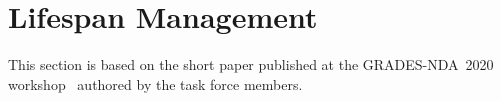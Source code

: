 



\section{Lifespan Management}
\label{sec:lifespan-management}

This section is based on the short paper published at the GRADES-NDA~2020 workshop~\cite{DBLP:conf/sigmod/WaudbySPS20} authored by the task force members.

